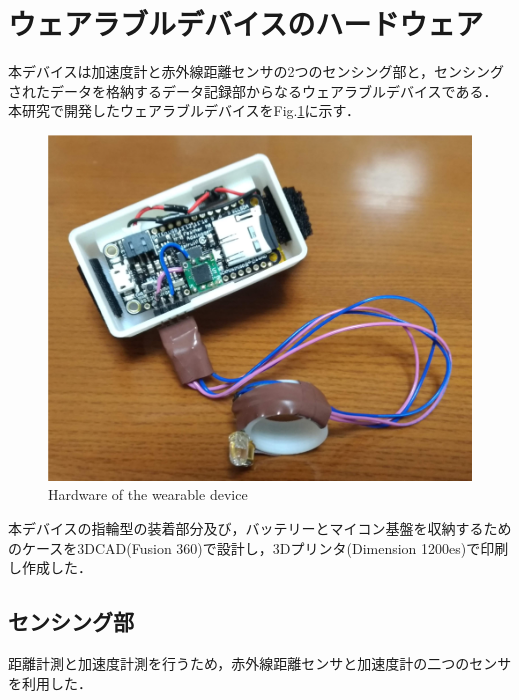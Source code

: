 \section{ウェアラブルデバイスのハードウェア}
本デバイスは加速度計と赤外線距離センサの2つのセンシング部と，センシングされたデータを格納するデータ記録部からなるウェアラブルデバイスである．
本研究で開発したウェアラブルデバイスをFig.\ref{fig:device}に示す．
\begin{figure}[H]
  \centering
  \includegraphics[width=0.8\linewidth]{fig/fal6}
  \caption{Hardware of the wearable device}
  \label{fig:device}
\end{figure}


本デバイスの指輪型の装着部分及び，バッテリーとマイコン基盤を収納するためのケースを3DCAD(Fusion 360)で設計し，3Dプリンタ(Dimension 1200es)で印刷し作成した．


\subsection*{センシング部}
距離計測と加速度計測を行うため，赤外線距離センサと加速度計の二つのセンサを利用した．
